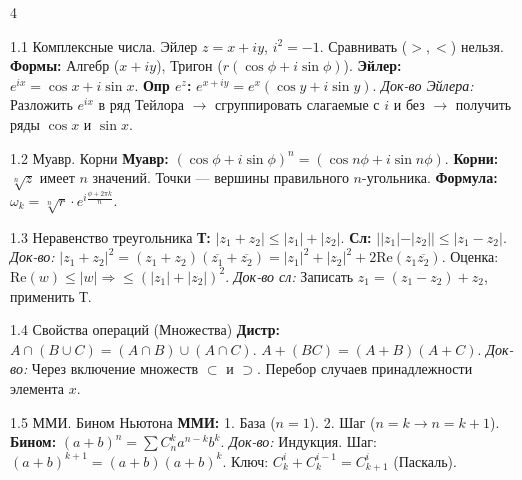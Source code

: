 \documentclass[8pt, a4paper, landscape]{extarticle}
\newcommand{\Ra}{\Rightarrow}
\begin{document}
\pagestyle{empty} %

\begin{multicols*}{4} %


\begin{ticket}{1.1 Комплексные числа. Эйлер}
$z = x+iy$, $i^2=-1$. Сравнивать ($>, <$) нельзя.
\textbf{Формы:} Алгебр ($x+iy$), Тригон ($r(\cos\phi + i\sin\phi)$).
\textbf{Эйлер:} $e^{ix} = \cos x + i\sin x$.
\textbf{Опр $e^z$:} $e^{x+iy} = e^x(\cos y + i\sin y)$.
\tcblower
\textit{Док-во Эйлера:} Разложить $e^{ix}$ в ряд Тейлора $\to$ сгруппировать слагаемые с $i$ и без $\to$ получить ряды $\cos x$ и $\sin x$.
\end{ticket}

\begin{ticket}{1.2 Муавр. Корни}
\textbf{Муавр:} $(\cos \phi + i\sin \phi)^n = (\cos n\phi + i\sin n\phi)$.
\textbf{Корни:} $\sqrt[n]{z}$ имеет $n$ значений. Точки — вершины правильного $n$-угольника.
\textbf{Формула:} $\omega_k = \sqrt[n]{r} \cdot e^{i \frac{\phi + 2\pi k}{n}}$.
\end{ticket}

\begin{ticket}{1.3 Неравенство треугольника}
\textbf{Т:} $|z_1 + z_2| \le |z_1| + |z_2|$.
\textbf{Сл:} $||z_1| - |z_2|| \le |z_1 - z_2|$.
\tcblower
\textit{Док-во:} $|z_1+z_2|^2 = (z_1+z_2)(\overline{z_1}+\overline{z_2}) = |z_1|^2 + |z_2|^2 + 2\text{Re}(z_1\overline{z_2})$.
Оценка: $\text{Re}(w) \le |w| \Ra \le (|z_1|+|z_2|)^2$.
\textit{Док-во сл:} Записать $z_1 = (z_1-z_2) + z_2$, применить Т.
\end{ticket}

\begin{ticket}{1.4 Свойства операций (Множества)}
\textbf{Дистр:} $A \cap (B \cup C) = (A \cap B) \cup (A \cap C)$.
$A + (BC) = (A + B)(A + C)$.
\tcblower
\textit{Док-во:} Через включение множеств $\subset$ и $\supset$. Перебор случаев принадлежности элемента $x$.
\end{ticket}

\begin{ticket}{1.5 ММИ. Бином Ньютона}
\textbf{ММИ:} 1. База ($n=1$). 2. Шаг ($n=k \to n=k+1$).
\textbf{Бином:} $(a+b)^n = \sum C_n^k a^{n-k}b^k$.
\tcblower
\textit{Док-во:} Индукция. Шаг: $(a+b)^{k+1} = (a+b)(a+b)^k$.
Ключ: $C_k^i + C_k^{i-1} = C_{k+1}^i$ (Паскаль).
\end{ticket}


\end{multicols*}
\end{document}
